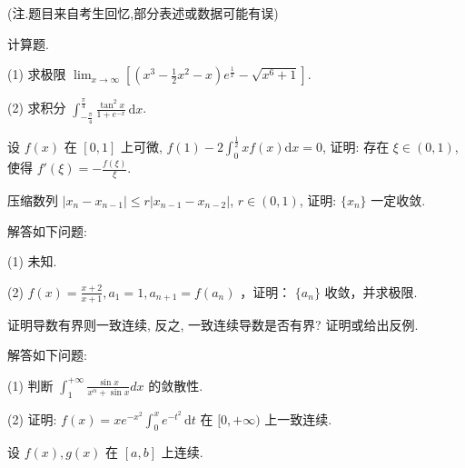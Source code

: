 (注.题目来自考生回忆,部分表述或数据可能有误)\par
计算题.\par
(1) 求极限 $\lim_{x\to \infty}\left[\left(x^3 -\frac{1}{2} x^2 -x\right)e^{\frac{1}{x}} - \sqrt{x^6 + 1}\right].$\par
(2) 求积分 $\int_{-\frac{\pi}{4}}^{\frac{\pi}{4}} \frac{\tan^2 x}{1 + e^{-x}} \, \mathrm{d}x$.\par
设 $f(x)$ 在 $[0,1]$ 上可微, $f(1) - 2\int_{0}^{\frac{1}{2}}xf(x)\mathrm{d}x = 0$, 证明: 存在 $\xi \in (0,1)$, 使得 $f'(\xi) = -\frac{f(\xi)}{\xi}$.\par
压缩数列 $|x_{n} - x_{n - 1}| \leq r|x_{n - 1} - x_{n - 2}|$, $r \in (0,1)$, 证明: $\{x_{n}\}$ 一定收敛.\par
解答如下问题:\par
(1) 未知.\par
(2) $f(x) = \frac{x + 2}{x + 1}, a_{1} = 1, a_{n + 1} = f(a_{n})$ ，证明： $\{a_{n}\}$ 收敛，并求极限.\par
证明导数有界则一致连续, 反之, 一致连续导数是否有界? 证明或给出反例.\par
解答如下问题:\par
(1) 判断  $\int_{1}^{+\infty}\frac{\sin x}{x^{\alpha}+\sin x}dx$  的敛散性.\par
(2) 证明: $f(x) = xe^{-x^2} \int_0^x e^{-t^2} \, \mathrm{d}t$ 在 $[0, +\infty)$ 上一致连续.\par
设 $f(x), g(x)$ 在 $[a, b]$ 上连续.\par
\par{}
